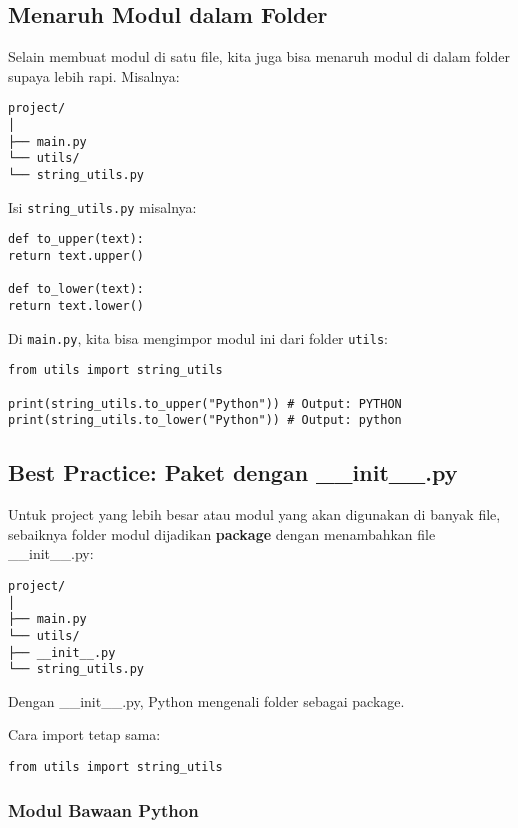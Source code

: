 \subsection{Menaruh Modul dalam Folder}

Selain membuat modul di satu file, kita juga bisa menaruh modul di dalam folder supaya lebih rapi. Misalnya:

\begin{verbatim}
project/
│
├── main.py
└── utils/
└── string_utils.py
\end{verbatim}

Isi \texttt{string_utils.py} misalnya:

\begin{lstlisting}[style=PythonStyle, caption={Kode Python: utils/string_utils.py}]
def to_upper(text):
return text.upper()

def to_lower(text):
return text.lower()
\end{lstlisting}

Di \texttt{main.py}, kita bisa mengimpor modul ini dari folder \texttt{utils}:

\begin{lstlisting}[style=PythonStyle, caption={Kode Python: main.py}]
from utils import string_utils

print(string_utils.to_upper("Python")) # Output: PYTHON
print(string_utils.to_lower("Python")) # Output: python
\end{lstlisting}

\subsection{Best Practice: Paket dengan __init__.py}

Untuk project yang lebih besar atau modul yang akan digunakan di banyak file, sebaiknya folder modul dijadikan \textbf{package} dengan menambahkan file __init__.py:

\begin{verbatim}
project/
│
├── main.py
└── utils/
├── __init__.py
└── string_utils.py
\end{verbatim}

Dengan __init__.py, Python mengenali folder sebagai package.

Cara import tetap sama:

\begin{lstlisting}[style=PythonStyle]
from utils import string_utils
\end{lstlisting}

\subsubsection{Modul Bawaan Python}

